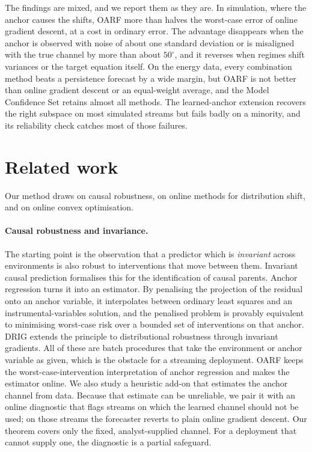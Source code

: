 \documentclass[12pt]{article}
\theoremstyle{plain}
\theoremstyle{remark}
\newcommand{\OARF}{\textsc{OARF}}
\begin{document}
The findings are mixed, and we report them as they are. In simulation, where the
anchor causes the shifts, \OARF{} more than halves the worst-case error of online
gradient descent, at a cost in ordinary error. The advantage disappears when the
anchor is observed with noise of about one standard deviation or is misaligned with the
true channel by more than about $50^\circ$, and it reverses when regimes shift
variances or the target equation itself. On the energy data, every combination method
beats a persistence forecast by a wide margin, but \OARF{} is not better than online
gradient descent or an equal-weight average, and the Model Confidence Set retains
almost all methods. The learned-anchor extension recovers the right subspace on most
simulated streams but fails badly on a minority, and its reliability check catches
most of those failures.

\section{Related work}\label{sec:related}

Our method draws on causal robustness, on online methods for distribution shift, and
on online convex optimisation.

\paragraph{Causal robustness and invariance.} The starting point is the observation
that a predictor which is \emph{invariant} across environments is also robust to
interventions that move between them. Invariant causal prediction
\citep{peters2016invariant} formalises this for the identification of causal
parents. Anchor regression \citep{rothenhausler2021anchor} turns it into an
estimator. By penalising the projection of the residual onto an anchor variable, it
interpolates between ordinary least squares and an instrumental-variables solution,
and the penalised problem is provably equivalent to minimising worst-case risk over
a bounded set of interventions on that anchor. DRIG \citep{shen2023drig} extends
the principle to distributional robustness through invariant gradients. All of
these are batch procedures that take the environment or anchor variable as given,
which is the obstacle for a streaming deployment. \OARF{} keeps the
worst-case-intervention interpretation of anchor regression and makes the estimator
online. We also study a heuristic add-on that estimates the anchor channel from
data. Because that estimate can be unreliable, we pair it with an online diagnostic
that flags streams on which the learned channel should not be used; on those streams
the forecaster reverts to plain online gradient descent. Our theorem covers only the
fixed, analyst-supplied channel. For a deployment that cannot supply one, the
diagnostic is a partial safeguard.
\end{document}
